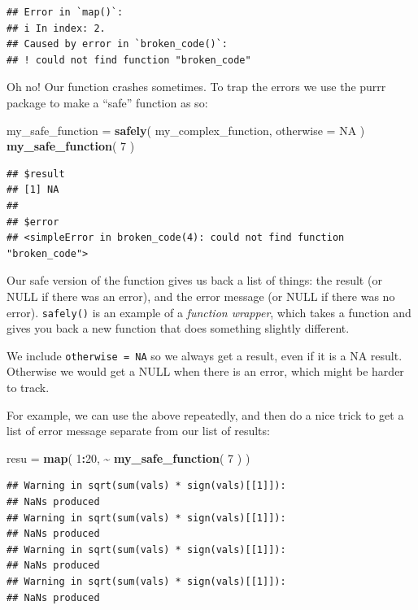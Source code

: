 \documentclass[
]{book}
\newenvironment{Shaded}{\begin{snugshade}}{\end{snugshade}}
\newcommand{\AttributeTok}[1]{\textcolor[rgb]{0.13,0.29,0.53}{#1}}
\newcommand{\ConstantTok}[1]{\textcolor[rgb]{0.56,0.35,0.01}{#1}}
\newcommand{\DecValTok}[1]{\textcolor[rgb]{0.00,0.00,0.81}{#1}}
\newcommand{\FunctionTok}[1]{\textcolor[rgb]{0.13,0.29,0.53}{\textbf{#1}}}
\newcommand{\NormalTok}[1]{#1}
\newcommand{\OtherTok}[1]{\textcolor[rgb]{0.56,0.35,0.01}{#1}}
\newcommand{\SpecialCharTok}[1]{\textcolor[rgb]{0.81,0.36,0.00}{\textbf{#1}}}
\begin{document}
\begin{verbatim}
## Error in `map()`:
## i In index: 2.
## Caused by error in `broken_code()`:
## ! could not find function "broken_code"
\end{verbatim}

Oh no! Our function crashes sometimes.
To trap the errors we use the purrr package to make a ``safe'' function as so:

\begin{Shaded}
\begin{Highlighting}[]
\NormalTok{my\_safe\_function }\OtherTok{=} \FunctionTok{safely}\NormalTok{( my\_complex\_function,}
                           \AttributeTok{otherwise =} \ConstantTok{NA}\NormalTok{ )}
\FunctionTok{my\_safe\_function}\NormalTok{( }\DecValTok{7}\NormalTok{ )}
\end{Highlighting}
\end{Shaded}

\begin{verbatim}
## $result
## [1] NA
## 
## $error
## <simpleError in broken_code(4): could not find function "broken_code">
\end{verbatim}

Our safe version of the function gives us back a list of things: the result (or NULL if there was an error), and the error message (or NULL if there was no error).
\texttt{safely()} is an example of a \emph{function wrapper}, which takes a function and gives you back a new function that does something slightly different.

We include \texttt{otherwise\ =\ NA} so we always get a result, even if it is a NA result. Otherwise we would get a NULL when there is an error, which might be harder to track.

For example, we can use the above repeatedly, and then do a nice trick to get a list of error message separate from our list of results:

\begin{Shaded}
\begin{Highlighting}[]
\NormalTok{resu }\OtherTok{=} \FunctionTok{map}\NormalTok{( }\DecValTok{1}\SpecialCharTok{:}\DecValTok{20}\NormalTok{, }\SpecialCharTok{\textasciitilde{}} \FunctionTok{my\_safe\_function}\NormalTok{( }\DecValTok{7}\NormalTok{ ) )}
\end{Highlighting}
\end{Shaded}

\begin{verbatim}
## Warning in sqrt(sum(vals) * sign(vals)[[1]]):
## NaNs produced
## Warning in sqrt(sum(vals) * sign(vals)[[1]]):
## NaNs produced
## Warning in sqrt(sum(vals) * sign(vals)[[1]]):
## NaNs produced
## Warning in sqrt(sum(vals) * sign(vals)[[1]]):
## NaNs produced
\end{verbatim}
\end{document}

